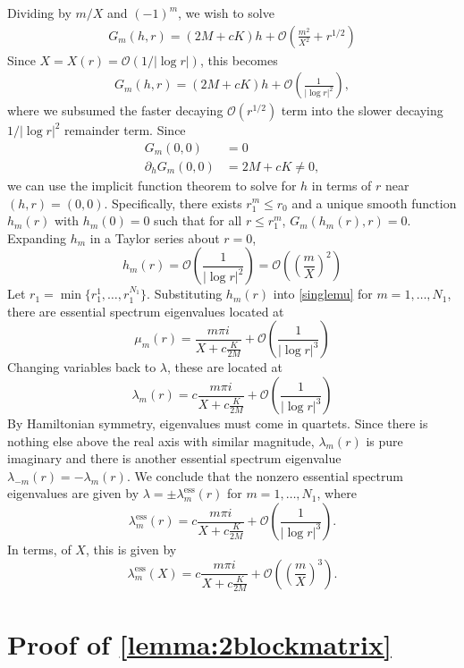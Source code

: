 \documentclass[thesis.tex]{subfiles}
\begin{document}
Dividing by $m/X$ and $(-1)^m$, we wish to solve 
\begin{align*}
G_m(h, r) = \left( 2M + cK \right)h + \mathcal{O}\left( \frac{m^2}{X^2} + r^{1/2} \right)
\end{align*}
Since $X = X(r) = \mathcal{O}(1/|\log r|)$, this becomes
\begin{align*}
G_m(h, r) = \left( 2M + cK \right)h + \mathcal{O}\left( \frac{1}{|\log r|^2} \right),
\end{align*}
where we subsumed the faster decaying $\mathcal{O}(r^{1/2})$ term into the slower decaying $1/|\log r|^2$ remainder term. Since
\begin{align*}
G_m(0,0) &= 0 \\
\partial_h G_m(0,0) &= 2M + cK \neq 0,
\end{align*}
we can use the implicit function theorem to solve for $h$ in terms of $r$ near $(h,r) = (0,0)$. Specifically, there exists $r_1^m \leq r_0$ and a unique smooth function $h_m(r)$ with $h_m(0) = 0$ such that for all $r \leq r_1^m$, $G_m(h_m(r),r) = 0$. Expanding $h_m$ in a Taylor series about $r = 0$,
\[
h_m(r) = \mathcal{O}\left( \frac{1}{|\log r|^2} \right) = \mathcal{O}\left( \left(\frac{m}{X}\right)^2 \right)
\]
Let $r_1 = \min\{ r_1^1, \dots, r_1^{N_1} \}$. Substituting $h_m(r)$ into \cref{singlemu} for $m = 1, \dots, N_1$, there are essential spectrum eigenvalues located at
\[
\mu_m(r) = \frac{m \pi i}{X + c \frac{K}{2 M}} + \mathcal{O}\left( \frac{1}{|\log r|^3} \right)
\]
Changing variables back to $\lambda$, these are located at
\[
\lambda_m(r) = c  \frac{m \pi i}{X + c \frac{K}{2 M}} + \mathcal{O}\left( \frac{1}{|\log r|^3} \right)
\]
By Hamiltonian symmetry, eigenvalues must come in quartets. Since there is nothing else above the real axis with similar magnitude, $\lambda_m(r)$ is pure imaginary and there is another essential spectrum eigenvalue $\lambda_{-m}(r) = -\lambda_m(r)$. We conclude that the nonzero essential spectrum eigenvalues are given by $\lambda = \pm \lambda_m^{\text{ess}}(r)$ for $m = 1, \dots, N_1$, where
\[
\lambda_m^{\text{ess}}(r) = c  \frac{m \pi i}{X + c \frac{K}{2 M}} + \mathcal{O}\left( \frac{1}{|\log r|^3} \right).
\]
In terms, of $X$, this is given by
\[
\lambda_m^{\text{ess}}(X) = c  \frac{m \pi i}{X + c \frac{K}{2 M}} + \mathcal{O}\left( \left(\frac{m}{X}\right)^3\right).
\]

\section{Proof of \cref{lemma:2blockmatrix} }
\end{document}
